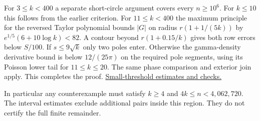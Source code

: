 For $3\le k<400$ a separate short-circle argument covers every $n\ge10^6$.
For $k\le10$ this follows from the earlier criterion.
For $11\le k<400$ the maximum principle for the reversed Taylor
polynomial bounds $|G|$ on radius $r(1+1/(5k))$ by
$e^{1/5}(6+10\log k)<82$. A contour beyond $r(1+0.15/k)$ gives both
row errors below $S/100$. If $s\le9\sqrt k$ only two poles enter.
Otherwise the gamma-density derivative bound is below $12/(25\pi)$
on the required pole segments, using its Poisson lower tail for
$11\le k\le20$. The same phase comparison and exterior join apply.
This completes the proof.
\href{https://github.com/ProgramComputer/open-math-research/blob/main/topics/long-cycle-excedances/small-threshold-circle.md}{Small-threshold estimates and checks.}

In particular any counterexample must satisfy $k\ge4$ and
$4k\le n<4{,}062{,}720$. The interval estimates exclude additional
pairs inside this region. They do not certify the full finite remainder.
